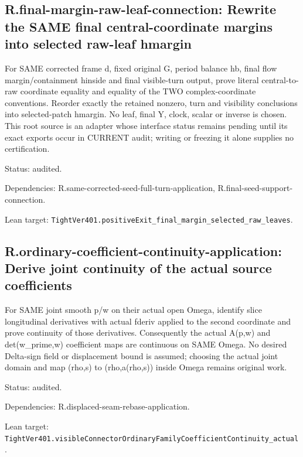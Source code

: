 \documentclass{article}
\begin{document}
\subsection*{R.final-margin-raw-leaf-connection: Rewrite the SAME final central-coordinate margins into selected raw-leaf hmargin}
For SAME corrected frame d, fixed original G, period balance hb, final flow margin/containment hinside and final visible-turn output, prove literal central-to-raw coordinate equality and equality of the TWO complex-coordinate conventions. Reorder exactly the retained nonzero, turn and visibility conclusions into selected-patch hmargin. No leaf, final Y, clock, scalar or inverse is chosen. This root source is an adapter whose interface status remains pending until its exact exports occur in CURRENT audit; writing or freezing it alone supplies no certification.
\par Status: audited.
\par Dependencies: R.same-corrected-seed-full-turn-application, R.final-seed-support-connection.
\par Lean target: \texttt{TightVer401.positiveExit\_final\_margin\_selected\_raw\_leaves}.
\subsection*{R.ordinary-coefficient-continuity-application: Derive joint continuity of the actual source coefficients}
For SAME joint smooth p/w on their actual open Omega, identify slice longitudinal derivatives with actual fderiv applied to the second coordinate and prove continuity of those derivatives. Consequently the actual A(p,w) and det(w\_prime,w) coefficient maps are continuous on SAME Omega. No desired Delta-sign field or displacement bound is assumed; choosing the actual joint domain and map (rho,s) to (rho,a(rho,s)) inside Omega remains original work.
\par Status: audited.
\par Dependencies: R.displaced-seam-rebase-application.
\par Lean target: \texttt{TightVer401.visibleConnectorOrdinaryFamilyCoefficientContinuity\_actual}.
\end{document}
